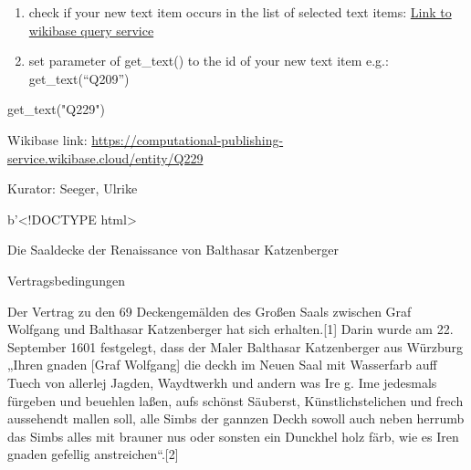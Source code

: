 \documentclass[
  letterpaper,
]{book}
\newenvironment{Shaded}{\begin{snugshade}}{\end{snugshade}}
\newcommand{\NormalTok}[1]{\textcolor[rgb]{0.00,0.23,0.31}{#1}}
\newcommand{\StringTok}[1]{\textcolor[rgb]{0.13,0.47,0.30}{#1}}
\begin{document}
\begin{enumerate}
\def\labelenumi{\arabic{enumi}.}
\setcounter{enumi}{1}
\item
  check if your new text item occurs in the list of selected text items:
  \href{https://computational-publishing-service.wikibase.cloud/query/\#PREFIX\%20cps\%3A\%20\%3Chttps\%3A\%2F\%2Fcomputational-publishing-service.wikibase.cloud\%2Fentity\%2F\%3E\%0APREFIX\%20cpss\%3A\%20\%3Chttps\%3A\%2F\%2Fcomputational-publishing-service.wikibase.cloud\%2Fentity\%2Fstatement\%2F\%3E\%0APREFIX\%20cpsv\%3A\%20\%3Chttps\%3A\%2F\%2Fcomputational-publishing-service.wikibase.cloud\%2Fvalue\%2F\%3E\%0APREFIX\%20cpspt\%3A\%20\%3Chttps\%3A\%2F\%2Fcomputational-publishing-service.wikibase.cloud\%2Fprop\%2Fdirect\%2F\%3E\%0APREFIX\%20cpsp\%3A\%20\%3Chttps\%3A\%2F\%2Fcomputational-publishing-service.wikibase.cloud\%2Fprop\%2F\%3E\%0APREFIX\%20cpsps\%3A\%20\%3Chttps\%3A\%2F\%2Fcomputational-publishing-service.wikibase.cloud\%2Fprop\%2Fstatement\%2F\%3E\%0APREFIX\%20cpspq\%3A\%20\%3Chttps\%3A\%2F\%2Fcomputational-publishing-service.wikibase.cloud\%2Fprop\%2Fqualifier\%2F\%3E\%0A\%0ASELECT\%20\%3FtextItem\%20\%3FkuratorLabel\%20\%3FtextUrl\%0AWHERE\%0A\%7B\%0A\%20\%20\%3FtextItem\%20cpsp\%3AP46\%20\%3FkuratorStatement.\%20\%0A\%20\%20\%3FkuratorStatement\%20cpsps\%3AP46\%20\%3FkuratorItem.\%20\%0A\%20\%20\%3FkuratorItem\%20rdfs\%3Alabel\%20\%3FkuratorLabel.\%0A\%20\%20\%3FtextItem\%20cpsp\%3AP57\%20\%3Furlstatement.\%20\%0A\%20\%20\%3Furlstatement\%20cpsps\%3AP57\%20\%3FtextUrl.\%20\%0A\%7D}{Link
  to wikibase query service}
\item
  set parameter of get\_text() to the id of your new text item e.g.:
  get\_text(``Q209'')
\end{enumerate}

\begin{Shaded}
\begin{Highlighting}[]
\NormalTok{get\_text(}\StringTok{"Q229"}\NormalTok{)}
\end{Highlighting}
\end{Shaded}

Wikibase link:
\url{https://computational-publishing-service.wikibase.cloud/entity/Q229}

Kurator: Seeger, Ulrike

b'\textless!DOCTYPE html\textgreater{}

Die Saaldecke der Renaissance von Balthasar Katzenberger

Vertragsbedingungen

Der Vertrag zu den 69 Deckengemälden des Großen Saals zwischen Graf
Wolfgang und Balthasar Katzenberger hat sich erhalten.{[}1{]} Darin
wurde am 22. September 1601 festgelegt, dass der Maler Balthasar
Katzenberger aus Würzburg „Ihren gnaden {[}Graf Wolfgang{]} die deckh im
Neuen Saal mit Wasserfarb auff Tuech von allerlej Jagden, Waydtwerkh und
andern was Ire g. Ime jedesmals fürgeben und beuehlen laßen, aufs
schönst Säuberst, Künstlichstelichen und frech aussehendt mallen soll,
alle Simbs der gannzen Deckh sowoll auch neben herrumb das Simbs alles
mit brauner nus oder sonsten ein Dunckhel holz färb, wie es Iren gnaden
gefellig anstreichen``.{[}2{]}
\end{document}
